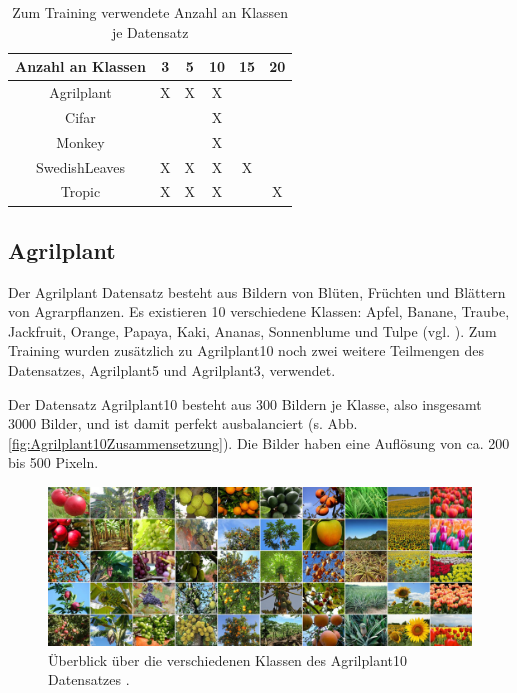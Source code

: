 \begin{table}
\centering
\begin{tabular}{|c|c|c|c|c|c|}
\hline 
Anzahl an Klassen & 3 & 5 & 10 & 15 & 20 \\ 
\hline 
Agrilplant & X & X & X &  &  \\ 
Cifar &  &  & X &  &  \\ 
Monkey &  &  & X &  &  \\ 
SwedishLeaves & X & X & X & X &  \\ 
Tropic & X & X & X & & X \\ 
\hline 
\end{tabular} 
\caption{Zum Training verwendete Anzahl an Klassen je Datensatz}
\label{fig:DatensatzKlassen}
\end{table}

\subsection{Agrilplant}
Der Agrilplant Datensatz \cite{pawaraWebsiteDatensaetze} besteht aus Bildern von Blüten, Früchten und Blättern von Agrarpflanzen.
Es existieren 10 verschiedene Klassen: Apfel, Banane, Traube, Jackfruit, Orange, Papaya, Kaki, Ananas, Sonnenblume und Tulpe (vgl. \cite{pawaraWebsiteDatensaetze}).
Zum Training wurden zusätzlich zu Agrilplant10 noch zwei weitere Teilmengen des Datensatzes, Agrilplant5 und Agrilplant3, verwendet.

Der Datensatz Agrilplant10 besteht aus 300 Bildern je Klasse, also insgesamt 3000 Bilder, und ist damit perfekt ausbalanciert (s. Abb. \ref{fig:Agrilplant10Zusammensetzung}).
Die Bilder haben eine Auflösung von ca. 200 bis 500 Pixeln. \\

\begin{figure}[H]
\includegraphics[scale=0.2]{img/2_agrilplant-image.jpg}
\caption{Überblick über die verschiedenen Klassen des Agrilplant10 Datensatzes \cite{pawaraAgrilplant}.}
\label{fig:agrilplantUeberblick}
\end{figure}

